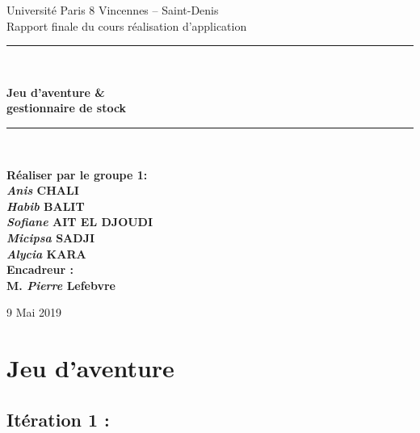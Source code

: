 \documentclass[french,10pt,a4paper]{report}
\begin{document}
\begin{titlepage}
  \begin{center}
  	{\LARGE{ Université Paris 8 Vincennes – Saint-Denis}}\\[6cm]
    {\Large Rapport finale du cours réalisation d'application}\\[0.5cm]
    {\rule{\linewidth}{0.5mm}\\}
    { \huge \textbf{Jeu d'aventure \& \\ gestionnaire de stock}\\}
    {\rule{\linewidth}{0.5mm}\\[1cm]} 
    \end{center}
	\vfill
  	\begin{flushleft}
        \textbf{Réaliser par le groupe 1:}\\
        \textbf{
		\hspace{4cm}\textit{Anis} CHALI\\      		
      	\hspace{4cm}\textit{Habib} BALIT\\
      	\hspace{4cm}\textit{Sofiane} AIT EL DJOUDI\\
      	\hspace{4cm}\textit{Micipsa} SADJI\\
      	\hspace{4cm}\textit{Alycia} KARA\\[1cm]
        	\textbf{Encadreur :}\\
        	\hspace{4cm} M. \textit{Pierre} Lefebvre}\\[1cm]
  	\end{flushleft}
  	\begin{center}
	  	{\large 9 Mai 2019}  	
  	\end{center}
\end{titlepage}
\tableofcontents
\newpage
\chapter{Jeu d'aventure}
\section{\textcolor{rr}{Itération 1 :}}
\end{document}
